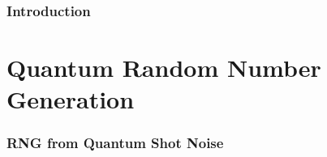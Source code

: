 
% 



\maketitle
\makeoutline

\begin{frame}[fragile]
  \frametitle{Introduction}
\end{frame}

\section{Quantum Random Number Generation}
\begin{frame}
  \frametitle{RNG from Quantum Shot Noise}
\end{frame}
